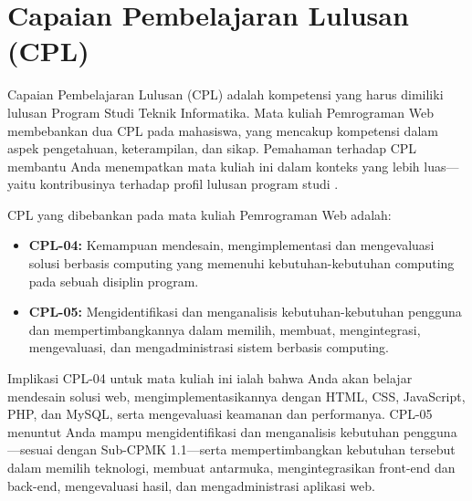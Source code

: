 \section{Capaian Pembelajaran Lulusan (CPL)}

Capaian Pembelajaran Lulusan (CPL) adalah kompetensi yang harus dimiliki lulusan Program Studi Teknik Informatika. Mata kuliah Pemrograman Web membebankan dua CPL pada mahasiswa, yang mencakup kompetensi dalam aspek pengetahuan, keterampilan, dan sikap. Pemahaman terhadap CPL membantu Anda menempatkan mata kuliah ini dalam konteks yang lebih luas---yaitu kontribusinya terhadap profil lulusan program studi \cite{aptikomObe}.

CPL yang dibebankan pada mata kuliah Pemrograman Web adalah:

\begin{itemize}[leftmargin=*]
  \item \textbf{CPL-04:} Kemampuan mendesain, mengimplementasi dan mengevaluasi solusi berbasis computing yang memenuhi kebutuhan-kebutuhan computing pada sebuah disiplin program.
  \item \textbf{CPL-05:} Mengidentifikasi dan menganalisis kebutuhan-kebutuhan pengguna dan mempertimbangkannya dalam memilih, membuat, mengintegrasi, mengevaluasi, dan mengadministrasi sistem berbasis computing.
\end{itemize}

Implikasi CPL-04 untuk mata kuliah ini ialah bahwa Anda akan belajar mendesain solusi web, mengimplementasikannya dengan HTML, CSS, JavaScript, PHP, dan MySQL, serta mengevaluasi keamanan dan performanya. CPL-05 menuntut Anda mampu mengidentifikasi dan menganalisis kebutuhan pengguna---sesuai dengan Sub-CPMK 1.1---serta mempertimbangkan kebutuhan tersebut dalam memilih teknologi, membuat antarmuka, mengintegrasikan front-end dan back-end, mengevaluasi hasil, dan mengadministrasi aplikasi web.
